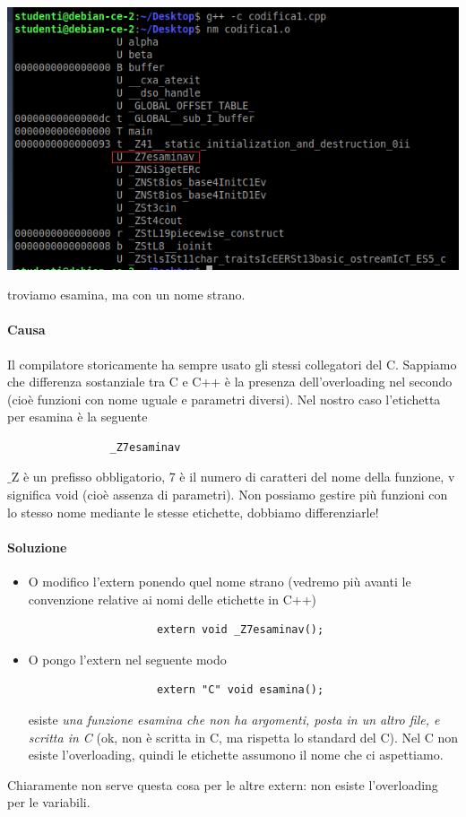 			\begin{center}
				\includegraphics{img/152.PNG}
			\end{center} 
			troviamo esamina, ma con un nome strano.
			\paragraph{Causa} Il compilatore storicamente ha sempre usato gli stessi collegatori del C. Sappiamo che differenza sostanziale tra C e C++ è la presenza dell'overloading nel secondo (cioè funzioni con nome uguale e parametri diversi). Nel nostro caso l'etichetta per esamina è la seguente
			\begin{verbatim}
				_Z7esaminav
			\end{verbatim}
			$\_$Z è un prefisso obbligatorio, 7 è il numero di caratteri del nome della funzione, v significa void (cioè assenza di parametri). Non possiamo gestire più funzioni con lo stesso nome mediante le stesse etichette, dobbiamo differenziarle! 
			\paragraph{Soluzione}
			\begin{itemize}
				\item O modifico l'extern ponendo quel nome strano (vedremo più avanti le convenzione relative ai nomi delle etichette in C++)
				\begin{verbatim}
					extern void _Z7esaminav();
				\end{verbatim}
				\item O pongo l'extern nel seguente modo
				\begin{verbatim}
					extern "C" void esamina();
				\end{verbatim}
				esiste \emph{una funzione esamina che non ha argomenti, posta in un altro file, e scritta in C} (ok, non è scritta in C, ma rispetta lo standard del C). Nel C non esiste l'overloading, quindi le etichette assumono il nome che ci aspettiamo.
			\end{itemize}
			Chiaramente non serve questa cosa per le altre extern: non esiste l'overloading per le variabili.
